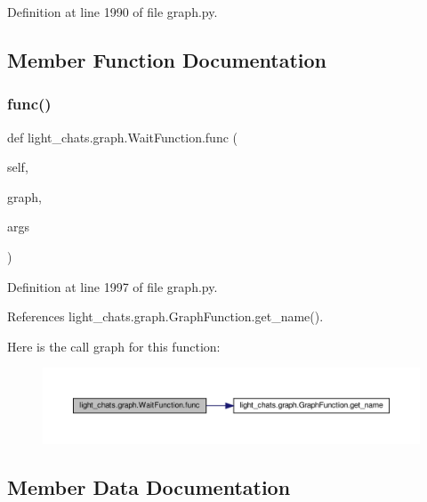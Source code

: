Definition at line 1990 of file graph.\+py.



\subsection{Member Function Documentation}
\mbox{\label{classlight__chats_1_1graph_1_1WaitFunction_a3349dc4d65c4b33440624bdbbeeb420c}} 
\subsubsection{\texorpdfstring{func()}{func()}}
{\footnotesize\ttfamily def light\+\_\+chats.\+graph.\+Wait\+Function.\+func (\begin{DoxyParamCaption}\item[{}]{self,  }\item[{}]{graph,  }\item[{}]{args }\end{DoxyParamCaption})}



Definition at line 1997 of file graph.\+py.



References light\+\_\+chats.\+graph.\+Graph\+Function.\+get\+\_\+name().

Here is the call graph for this function\+:
\nopagebreak
\begin{figure}[H]
\begin{center}
\leavevmode
\includegraphics[width=350pt]{classlight__chats_1_1graph_1_1WaitFunction_a3349dc4d65c4b33440624bdbbeeb420c_cgraph}
\end{center}
\end{figure}


\subsection{Member Data Documentation}
\mbox{\label{classlight__chats_1_1graph_1_1WaitFunction_a02e41ee37f4a2fe83153606100a5f979}} 
